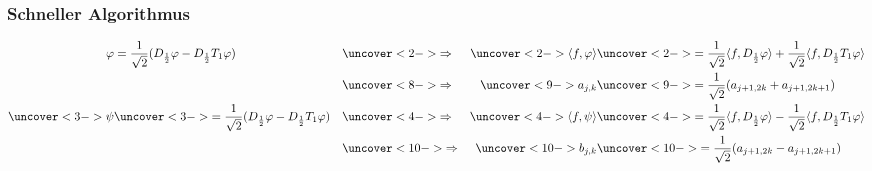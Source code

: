 %
%
%
\begin{frame}
\frametitle{Schneller Algorithmus}
\begin{align*}
\varphi
&=
\frac1{\sqrt{2}}(D_{\frac12}\varphi - D_{\frac12}T_1\varphi)
&&\uncover<2->{\Rightarrow}&
\uncover<2->{\langle f,\varphi\rangle}
&\uncover<2->{=
\frac1{\sqrt{2}} \langle f,D_{\frac12}\varphi\rangle
+
\frac1{\sqrt{2}} \langle f,D_{\frac12}T_1\varphi\rangle}
\\
&&&\uncover<8->{\Rightarrow}&
\uncover<9->{a_{j,k}}&\uncover<9->{=\frac1{\sqrt{2}} (a_{j+1,2k} + a_{j+1,2k+1})}
\\
\uncover<3->{\psi}
&\uncover<3->{=
\frac1{\sqrt{2}}(D_{\frac12}\varphi - D_{\frac12}T_1\varphi)}
&&\uncover<4->{\Rightarrow}&
\uncover<4->{\langle f,\psi\rangle}
&\uncover<4->{=
\frac1{\sqrt{2}} \langle f,D_{\frac12}\varphi\rangle
-
\frac1{\sqrt{2}} \langle f,D_{\frac12}T_1\varphi\rangle}
\\
&&&\uncover<10->{\Rightarrow}&
\uncover<10->{b_{j,k}}&\uncover<10->{=\frac1{\sqrt{2}} (a_{j+1,2k} - a_{j+1,2k+1})}
\end{align*}

\end{frame}

